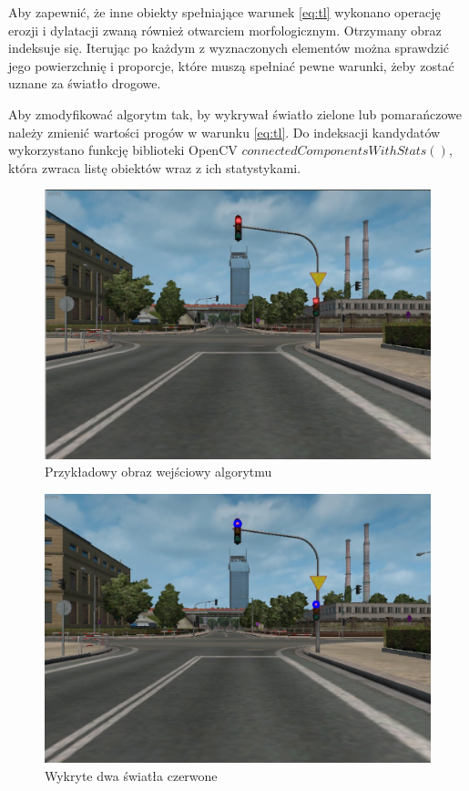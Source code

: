 Aby zapewnić, że inne obiekty spełniające warunek \ref{eq:tl} wykonano operację erozji i dylatacji zwaną również otwarciem morfologicznym. %
Otrzymany obraz indeksuje się. %
Iterując po każdym z wyznaczonych elementów można sprawdzić jego powierzchnię i proporcje, które muszą spełniać pewne warunki, żeby zostać uznane za światło drogowe.

Aby zmodyfikować algorytm tak, by wykrywał światło zielone lub pomarańczowe należy zmienić wartości progów w warunku \ref{eq:tl}. 
Do indeksacji kandydatów wykorzystano funkcję biblioteki OpenCV $connectedComponentsWithStats()$, która zwraca listę obiektów wraz z ich statystykami.

\begin{figure}
  \centering
  \includegraphics[width=13cm]{img/alg2_input.jpg}
  \caption{Przykładowy obraz wejściowy algorytmu}
  \label{fig:alg2_input}
\end{figure}

\begin{figure}
  \centering
  \includegraphics[width=13cm]{img/alg2_res.jpg}
  \caption{Wykryte dwa światła czerwone}
  \label{fig:alg2_res}
\end{figure}

